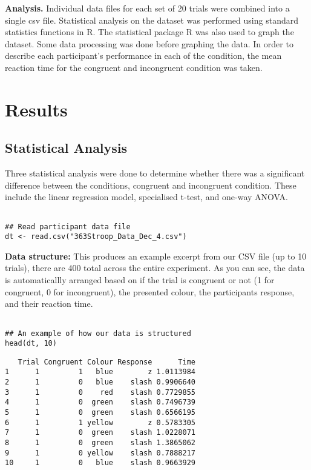 \documentclass{article}
\begin{document}
\textbf{Analysis.}  Individual data files for each set of 20 trials were combined into a single csv file. Statistical analysis on the dataset was performed using standard statistics functions in R. The statistical package R was also used to graph the dataset. Some data processing was done before graphing the data. In order to describe each participant's performance in each of the condition, the mean reaction time for the congruent and incongruent condition was taken. \\
\section{Results}
\label{sec:org4776a19}
\subsection{Statistical Analysis}
\label{sec:org2e45939}
\vspace{2em} Three statistical analysis were done to determine whether there was a significant difference between the conditions, congruent and incongruent condition. These include the linear regression model, specialised t-test, and one-way ANOVA.

\begin{verbatim}

## Read participant data file
dt <- read.csv("363Stroop_Data_Dec_4.csv")

\end{verbatim}

\textbf{Data structure:} This produces an example excerpt from our CSV file (up to 10 trials), there are 400 total across the entire experiment. As you can see, the data is automaticallly arranged based on if the trial is congruent or not (1 for congruent, 0 for incongruent), the presented colour, the participants response, and their reaction time.
\begin{verbatim}

## An example of how our data is structured
head(dt, 10)
\end{verbatim}

\begin{verbatim}
   Trial Congruent Colour Response      Time
1      1         1   blue        z 1.0113984
2      1         0   blue    slash 0.9906640
3      1         0    red    slash 0.7729855
4      1         0  green    slash 0.7496739
5      1         0  green    slash 0.6566195
6      1         1 yellow        z 0.5783305
7      1         0  green    slash 1.0228071
8      1         0  green    slash 1.3865062
9      1         0 yellow    slash 0.7888217
10     1         0   blue    slash 0.9663929
\end{verbatim}
\end{document}
